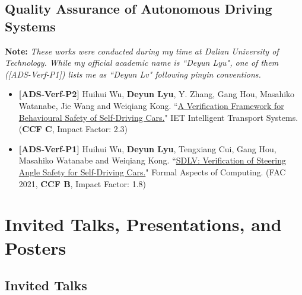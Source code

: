 \documentclass[11pt,a4paper]{moderncv}        %
\newcommand{\highlight}[1]{\textcolor{deepPurple}{\textbf{#1}}}
\begin{document}
\subsection{Quality Assurance of Autonomous Driving Systems} 
\noindent \textbf{Note:} \textit{These works were conducted during my time at Dalian University of Technology. While my official academic name is ``Deyun Lyu", one of them ([ADS-Verf-P1]) lists me as ``Deyun Lv" following pinyin conventions.}

\begin{itemize}
    \item \textbf{[ADS-Verf-P2]} Huihui Wu, \textbf{Deyun Lyu}, Y. Zhang, Gang Hou, Masahiko Watanabe, Jie Wang and Weiqiang Kong. ``\href{https://ietresearch.onlinelibrary.wiley.com/doi/full/10.1049/itr2.12162}{A Verification Framework for Behavioural Safety of Self-Driving Cars.}" IET Intelligent Transport Systems. (\highlight{CCF C}, Impact Factor: 2.3)
    \item \textbf{[ADS-Verf-P1]} Huihui Wu, \textbf{Deyun Lyu}, Tengxiang Cui, Gang Hou, Masahiko Watanabe and Weiqiang Kong. ``\href{https://link.springer.com/article/10.1007/s00165-021-00539-2}{SDLV: Verification of Steering Angle Safety for Self-Driving Cars.}" Formal Aspects of Computing. (FAC 2021, \highlight{CCF B}, Impact Factor: 1.8)
\end{itemize}

\section{Invited Talks, Presentations, and Posters}

\subsection{Invited Talks}
\end{document}
